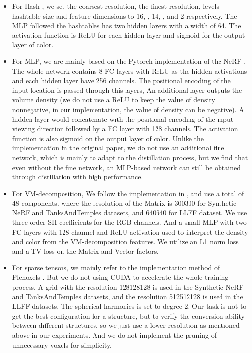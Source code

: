 \documentclass[letterpaper]{article} \usepackage{aaai23}  \usepackage{times}  \usepackage{helvet}  \usepackage{courier}  \usepackage[hyphens]{url}  \usepackage{graphicx} \urlstyle{rm} \def\UrlFont{\rm}  \usepackage{natbib}  \usepackage{caption} \frenchspacing  \setlength{\pdfpagewidth}{8.5in}  \setlength{\pdfpageheight}{11in}  \usepackage{multirow}
\begin{document}
\begin{itemize}
\item For Hash \cite{muller2022instant}, we set the coarsest resolution, the finest resolution, levels, hashtable size and feature dimensions to 16, , 14, , and 2 respectively. The MLP followed the hashtables has two hidden layers with a width of 64, The activation function is ReLU for each hidden layer and sigmoid for the output layer of color.
\item For MLP, we are mainly based on the Pytorch implementation of the NeRF \cite{lin2020NeRFpytorch}. The whole network contains 8 FC layers with ReLU as the hidden activations and each hidden layer have 256 channels. The positional encoding of the input location is passed through this layers, An additional layer outputs the volume density (we do not use a ReLU to keep the value of density nonnegative, in our implementation, the value of density can be negative). A hidden layer would concatenate with the positional encoding of the input viewing direction followed by a FC layer with 128 channels. The activation function is also sigmoid on the output layer of color. Unlike the implementation in the original paper, we do not use an additional fine network, which is mainly to adapt to the distillation process, but we find that even without the fine network, an MLP-based network can still be obtained through distillation with high performance.
\item For VM-decomposition, We follow the implementation in \cite{chen2022tensorf}, and use a total of 48 components, where the resolution of the Matrix is 300300 for Synthetic-NeRF and TanksAndTemples datasets, and 640640 for LLFF dataset. We use three-order SH coefficients for the RGB channels. And a small MLP with two FC layers with 128-channel and ReLU activation used to interpret the density and color from the VM-decomposition features. We utilize an L1 norm loss and a TV loss on the Matrix and Vector factors.
\item For sparse tensors, we mainly refer to the implementation method of Plenoxels \cite{fridovich2022plenoxels}. But we do not using CUDA to accelerate the whole training process. A grid with the resolution 128128128 is used in the Synthetic-NeRF and TanksAndTemples datasets, and the resolution 512512128 is used in the LLFF datasets. The spherical harmonics is set to degree 2. Our task is not to get the best configuration for a structure, but to verify the conversion ability between different structures, so we just use a lower resolution as mentioned above in our experiments. And we do not implement the pruning of unnecessary voxels for simplicity.
\end{itemize}
\end{document}
